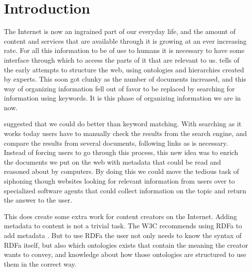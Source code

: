 
\chapter{Introduction} %

\label{Introduction}



The Internet is now an ingrained part of our everyday life,
and the amount of content and services that are available through it is growing at an ever increasing rate.
For all this information to be of use to humans it is necessary to have some interface through which to access the parts of it that are relevant to us.
\citet{Shirky2007} tells of the early attempts to structure the web,
using ontologies and hierarchies created by experts.
This soon got clunky as the number of documents increased,
and this way of organizing information fell out of favor to be replaced by searching for information using keywords.
It is this phase of organizing information we are in now.

\citet{Berners-Lee2001} suggested that we could do better than keyword matching.
With searching as it works today users have to manually check the results from the search engine,
and compare the results from several documents, following links as is necessary.
Instead of forcing users to go through this process,
this new idea was to enrich the documents we put on the web with metadata that could be read and reasoned about by computers.
By doing this we could move the tedious task of siphoning though websites looking for relevant information from users
over to specialized software agents that could collect information on the topic and return the answer to the user.

This does create some extra work for content creators on the Internet.
Adding metadata to content is not a trivial task.
The W3C recommends using RDFa to add metadata \citep{Pemberton:08:RXS}.
But to use RDFa the user not only needs to know the syntax of RDFa itself,
but also which ontologies exists that contain the meaning the creator wants to convey,
and knowledge about how those ontologies are structured to use them in the correct way.

